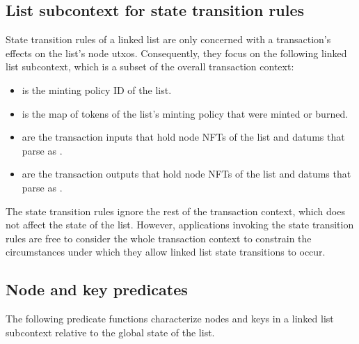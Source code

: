 \documentclass[../midgard.tex]{subfiles}
\begin{document}
\subsection{List subcontext for state transition rules}
\label{h:list-subcontext}

State transition rules of a linked list are only concerned with a transaction's effects on the list's node utxos.
Consequently, they focus on the following linked list subcontext, which is a subset of the overall transaction context:
\begin{itemize}
    \item {} is the minting policy ID of the list.
    \item {} is the map of tokens of the list's minting policy that were minted or burned.
    \item {} are the transaction inputs that hold node NFTs of the list and datums that parse as .
    \item {} are the transaction outputs that hold node NFTs of the list and datums that parse as .
\end{itemize}

The state transition rules ignore the rest of the transaction context, which does not affect the state of the list.
However, applications invoking the state transition rules are free to consider the whole transaction context to constrain the circumstances under which they allow linked list state transitions to occur.

\subsection{Node and key predicates}
\label{h:list-node-key-predicates}

The following predicate functions characterize nodes and keys in a linked list subcontext relative to the global state of the list.
\end{document}
